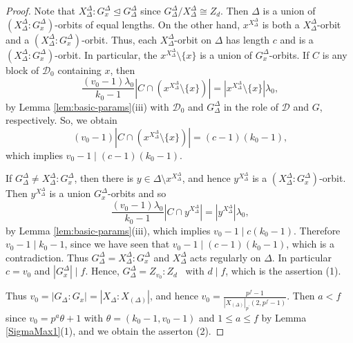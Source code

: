 \documentclass[a4paper,twopage,reqno,12pt]{amsart}
\theoremstyle{definition}
\numberwithin{equation}{section}
\renewcommand{\leq}{\leqslant}
\begin{document}
\begin{proof}
Note that $X_{\Delta
}^{\Delta }:G_{x}^{\Delta }\trianglelefteq G_{\Delta }^{\Delta }$ since $G_{\Delta }^{\Delta }/X_{\Delta }^{\Delta }\cong Z_{d}$. Then $\Delta $ is a
union of $(X_{\Delta }^{\Delta }:G_{x}^{\Delta })$-orbits of equal lengths.
On the other hand, $x^{X_{\Delta }^{\Delta }}$ is both a $X_{\Delta
}^{\Delta }$-orbit and a $(X_{\Delta }^{\Delta }:G_{x}^{\Delta })$-orbit.
Thus, each $X_{\Delta }^{\Delta }$-orbit on $\Delta $ has length $c$ and is a $(X_{\Delta
}^{\Delta }:G_{x}^{\Delta })$-orbit. In particular, the $x^{X_{\Delta
}^{\Delta }}\setminus \{x\}$ is a union of $G_{x}^{\Delta }$-orbits. If $C$
is any block of $\mathcal{D}_{0}$ containing $x$, then 
\begin{equation*}
\frac{\left( v_{0}-1\right) \lambda _{0}}{k_{0}-1}\left\vert C\cap
(x^{X_{\Delta }^{\Delta }}\setminus \{x\})\right\vert =\left\vert
x^{X_{\Delta }^{\Delta }}\setminus \{x\}\right\vert \lambda _{0}\text{,}
\end{equation*}
by Lemma \ref{lem:basic-params}(iii) with $\mathcal{D}_{0}$ and $G_{\Delta }^{\Delta }$ in the role of $\mathcal{D}$ and $G$, respectively. So, we obtain 
$$\left( v_{0}-1\right) \left\vert C\cap (x^{X_{\Delta }^{\Delta }}\setminus
\{x\})\right\vert =(c-1)(k_{0}-1)\text{,}$$
which implies $v_{0}-1 \mid (c-1)(k_{0}-1)$.

If $G_{\Delta }^{\Delta }\neq X_{\Delta }^{\Delta
}:G_{x}^{\Delta }$, then there is $y\in \Delta \setminus x^{X_{\Delta
}^{\Delta }}$, and hence $y^{X_{\Delta }^{\Delta }}$ is a $(X_{\Delta
}^{\Delta }:G_{x}^{\Delta })$-orbit. Then $y^{X_{\Delta }^{\Delta }}$ is a
union $G_{x}^{\Delta }$-orbits and so%
\begin{equation*}
\frac{\left( v_{0}-1\right) \lambda _{0}}{k_{0}-1}\left\vert C\cap
y^{X_{\Delta }^{\Delta }}\right\vert =\left\vert y^{X_{\Delta }^{\Delta
}}\right\vert \lambda _{0}\text{,}
\end{equation*}%
by Lemma \ref{lem:basic-params}(iii), which implies $v_{0}-1 \mid c(k_{0}-1)$. Therefore $v_{0}-1\mid k_{0}-1$, since we have seen that $v_{0}-1 \mid (c-1)(k_{0}-1)$, which is a contradiction. Thus $%
G_{\Delta }^{\Delta }=X_{\Delta }^{\Delta }:G_{x}^{\Delta }$ and $X_{\Delta
}^{\Delta }$ acts regularly on $\Delta $. In particular $c=v_{0}$ and $%
\left\vert G_{x}^{\Delta }\right\vert \mid f$. Hence, $G_{\Delta }^{\Delta
}=Z_{v_{0}}:Z_{d}$ \ with $d\mid f$, which is the assertion (1).

Thus $v_{0}=\left\vert G_{\Delta }:G_{x}\right\vert=\left\vert X_{\Delta }:X_{(\Delta )}\right\vert $, and hence $v_{0}=\frac{p^{f}-1}{\left\vert X_{(\Delta)}\right\vert _{p^{\prime }}(2,p^{f}-1)}$. Then $a<f$ since $v_{0}=p^{a}\theta+1$ with $\theta =\left( k_{0}-1,v_{0}-1\right)$ and $1\leq a \leq f$ by Lemma \ref{SigmaMax1}(1), and we obtain the asserton (2). 
\end{proof}
\end{document}
